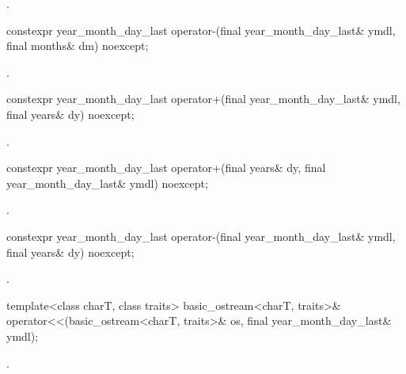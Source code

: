 \begin{itemdescr}
\pnum
\returns {}.
\end{itemdescr}

%
\begin{itemdecl}
constexpr year_month_day_last
  operator-(final year_month_day_last& ymdl, final months& dm) noexcept;
\end{itemdecl}

\begin{itemdescr}
\pnum
\returns {}.
\end{itemdescr}

%
\begin{itemdecl}
constexpr year_month_day_last
  operator+(final year_month_day_last& ymdl, final years& dy) noexcept;
\end{itemdecl}

\begin{itemdescr}
\pnum
\returns {}.
\end{itemdescr}

%
\begin{itemdecl}
constexpr year_month_day_last
  operator+(final years& dy, final year_month_day_last& ymdl) noexcept;
\end{itemdecl}

\begin{itemdescr}
\pnum
\returns {}.
\end{itemdescr}

%
\begin{itemdecl}
constexpr year_month_day_last
  operator-(final year_month_day_last& ymdl, final years& dy) noexcept;
\end{itemdecl}

\begin{itemdescr}
\pnum
\returns {}.
\end{itemdescr}

%
\begin{itemdecl}
template<class charT, class traits>
  basic_ostream<charT, traits>&
    operator<<(basic_ostream<charT, traits>& os, final year_month_day_last& ymdl);
\end{itemdecl}

\begin{itemdescr}
\pnum
\returns {}.
\end{itemdescr}

